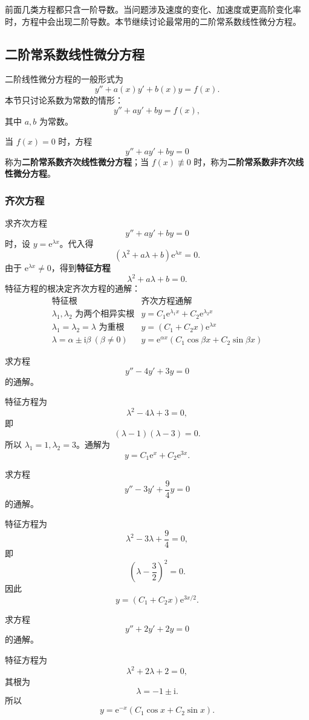\documentclass[fontset=fandol]{ctexart}
\newcommand{\ee}{\mathrm{e}}
\newcommand{\ii}{\mathrm{i}}
\begin{document}
前面几类方程都只含一阶导数。当问题涉及速度的变化、加速度或更高阶变化率时，方程中会出现二阶导数。本节继续讨论最常用的二阶常系数线性微分方程。

\subsection{二阶常系数线性微分方程}

二阶线性微分方程的一般形式为
\[
y''+a(x)y'+b(x)y=f(x).
\]
本节只讨论系数为常数的情形：
\[
y''+ay'+by=f(x),
\]
其中 $a,b$ 为常数。

当 $f(x)=0$ 时，方程
\[
y''+ay'+by=0
\]
称为\textbf{二阶常系数齐次线性微分方程}；当 \(f(x)\not\equiv0\) 时，称为\textbf{二阶常系数非齐次线性微分方程}。

\subsubsection*{齐次方程}

求齐次方程
\[
y''+ay'+by=0
\]
时，设 $y=\ee^{\lambda x}$。代入得
\[
(\lambda^2+a\lambda+b)\ee^{\lambda x}=0.
\]
由于 $\ee^{\lambda x}\ne0$，得到\textbf{特征方程}
\[
\lambda^2+a\lambda+b=0.
\]
特征方程的根决定齐次方程的通解：
\[
\begin{array}{c|c}
\text{特征根} & \text{齐次方程通解}\\ \hline
\lambda_1,\lambda_2\text{ 为两个相异实根}
& y=C_1\ee^{\lambda_1x}+C_2\ee^{\lambda_2x}\\[0.4em]
\lambda_1=\lambda_2=\lambda\text{ 为重根}
& y=(C_1+C_2x)\ee^{\lambda x}\\[0.4em]
\lambda=\alpha\pm\ii\beta\ (\beta\ne0)
& y=\ee^{\alpha x}(C_1\cos\beta x+C_2\sin\beta x)
\end{array}
\]

\begin{example}[两个相异实根]
求方程
\[
y''-4y'+3y=0
\]
的通解。

特征方程为
\[
\lambda^2-4\lambda+3=0,
\]
即
\[
(\lambda-1)(\lambda-3)=0.
\]
所以 $\lambda_1=1,\lambda_2=3$。通解为
\[
y=C_1\ee^x+C_2\ee^{3x}.
\]
\end{example}

\begin{example}[重根]
求方程
\[
y''-3y'+\frac94y=0
\]
的通解。

特征方程为
\[
\lambda^2-3\lambda+\frac94=0,
\]
即
\[
\left(\lambda-\frac32\right)^2=0.
\]
因此
\[
y=(C_1+C_2x)\ee^{3x/2}.
\]
\end{example}

\begin{example}[共轭复根]
求方程
\[
y''+2y'+2y=0
\]
的通解。

特征方程为
\[
\lambda^2+2\lambda+2=0,
\]
其根为
\[
\lambda=-1\pm\ii.
\]
所以
\[
y=\ee^{-x}(C_1\cos x+C_2\sin x).
\]
\end{example}
\end{document}
